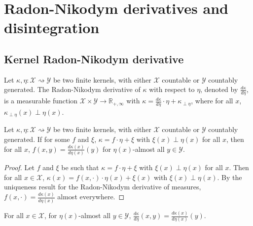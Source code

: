 \chapter{Radon-Nikodym derivatives and disintegration}


\section{Kernel Radon-Nikodym derivative}


\begin{definition}
  \label{def:kernel_rnDeriv}
  \leanok
  Let $\kappa, \eta : \mathcal X \rightsquigarrow \mathcal Y$ be two finite kernels, with either $\mathcal X$ countable or $\mathcal{Y}$ countably generated. The Radon-Nikodym derivative of $\kappa$ with respect to $\eta$, denoted by $\frac{d \kappa}{d \eta}$, is a measurable function $\mathcal X \times \mathcal Y \to \mathbb{R}_{+, \infty}$ with $\kappa = \frac{d \kappa}{d \eta} \cdot \eta + \kappa_{\perp \eta}$, where for all $x$, $\kappa_{\perp \eta}(x) \perp \eta(x)$.
\end{definition}


\begin{lemma}
  \label{lem:rnDeriv_unique}
  \leanok
  Let $\kappa, \eta : \mathcal X \rightsquigarrow \mathcal Y$ be two finite kernels, with either $\mathcal X$ countable or $\mathcal{Y}$ countably generated. If for some $f$ and $\xi$, $\kappa = f \cdot \eta + \xi$ with $\xi(x) \perp \eta(x)$ for all $x$, then for all $x$, $f(x, y) = \frac{d \kappa(x)}{d \eta(x)}(y)$ for $\eta(x)$-almost all $y \in \mathcal Y$.
\end{lemma}

\begin{proof} \leanok
Let $f$ and $\xi$ be such that $\kappa = f \cdot \eta + \xi$ with $\xi(x) \perp \eta(x)$ for all $x$. Then for all $x \in \mathcal X$, $\kappa(x) = f(x, \cdot) \cdot \eta(x) + \xi(x)$ with $\xi(x) \perp \eta(x)$. By the uniqueness result for the Radon-Nikodym derivative of measures, $f(x, \cdot) = \frac{d \kappa(x)}{d \eta(x)}$ almost everywhere.
\end{proof}


\begin{corollary}
  \label{cor:rnDeriv_value}
  \leanok
  For all $x \in \mathcal X$, for $\eta(x)$-almost all $y \in \mathcal Y$, $\frac{d \kappa}{d \eta}(x, y) = \frac{d \kappa(x)}{d \eta(x)}(y)$.
\end{corollary}


